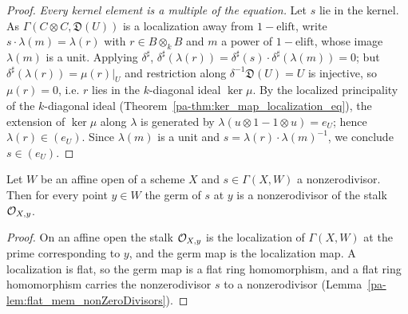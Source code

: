 \begin{proof}
  \emph{Every kernel element is a multiple of the equation.} Let \(s\) lie in the kernel. As
  \(\Gamma(C \otimes C, \mathfrak D(U))\) is a localization away from \(1 - \mathrm{elift}\), write
  \(s \cdot \lambda(m) = \lambda(r)\) with \(r \in B \otimes_k B\) and \(m\) a power of
  \(1 - \mathrm{elift}\), whose image \(\lambda(m)\) is a unit. Applying \(\delta^\sharp\),
  \(\delta^\sharp(\lambda(r)) = \delta^\sharp(s) \cdot \delta^\sharp(\lambda(m)) = 0\); but
  \(\delta^\sharp(\lambda(r)) = \mu(r)\big|_{U}\) and restriction along
  \(\delta^{-1}\mathfrak D(U) = U\) is injective, so \(\mu(r) = 0\), i.e. \(r\) lies in the
  \(k\)-diagonal ideal \(\ker \mu\). By the localized principality of the \(k\)-diagonal ideal
  (Theorem~\ref{pa-thm:ker_map_localization_eq}), the extension of \(\ker \mu\) along \(\lambda\) is
  generated by \(\lambda(u \otimes 1 - 1 \otimes u) = e_U\); hence \(\lambda(r) \in (e_U)\). Since
  \(\lambda(m)\) is a unit and \(s = \lambda(r) \cdot \lambda(m)^{-1}\), we conclude \(s \in (e_U)\).
\end{proof}

\begin{lemma}
  \label{pa-lem:affineOpen_germ_mem_nonZeroDivisors}
  \leanok

  Let \(W\) be an affine open of a scheme \(X\) and \(s \in \Gamma(X, W)\) a nonzerodivisor. Then
  for every point \(y \in W\) the germ of \(s\) at \(y\) is a nonzerodivisor of the stalk
  \(\mathcal{O}_{X, y}\).
\end{lemma}
\begin{proof}
  \leanok
  On an affine open the stalk \(\mathcal{O}_{X, y}\) is the localization of \(\Gamma(X, W)\) at the
  prime corresponding to \(y\), and the germ map is the localization map. A localization is flat,
  so the germ map is a flat ring homomorphism, and a flat ring homomorphism carries the
  nonzerodivisor \(s\) to a nonzerodivisor (Lemma~\ref{pa-lem:flat_mem_nonZeroDivisors}).
\end{proof}

